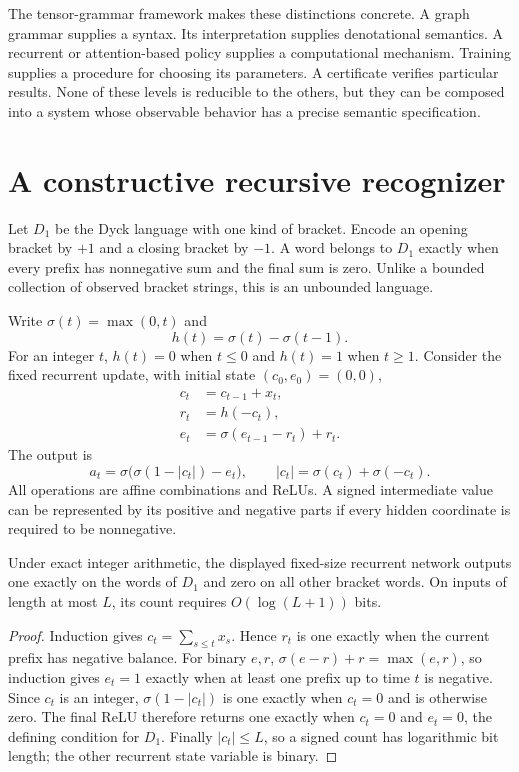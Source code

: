 The tensor-grammar framework makes these distinctions concrete. A graph grammar supplies a syntax. Its interpretation supplies denotational semantics. A recurrent or attention-based policy supplies a computational mechanism. Training supplies a procedure for choosing its parameters. A certificate verifies particular results. None of these levels is reducible to the others, but they can be composed into a system whose observable behavior has a precise semantic specification.

\section{A constructive recursive recognizer}

Let $D_1$ be the Dyck language with one kind of bracket. Encode an opening bracket by $+1$ and a closing bracket by $-1$. A word belongs to $D_1$ exactly when every prefix has nonnegative sum and the final sum is zero. Unlike a bounded collection of observed bracket strings, this is an unbounded language.

Write $\sigma(t)=\max(0,t)$ and
\[
 h(t)=\sigma(t)-\sigma(t-1).
\]
For an integer $t$, $h(t)=0$ when $t\le0$ and $h(t)=1$ when $t\ge1$. Consider the fixed recurrent update, with initial state $(c_0,e_0)=(0,0)$,
\begin{align*}
 c_t&=c_{t-1}+x_t,\\
 r_t&=h(-c_t),\\
 e_t&=\sigma(e_{t-1}-r_t)+r_t.
\end{align*}
The output is
\[
 a_t=\sigma\bigl(\sigma(1-|c_t|)-e_t\bigr),
 \qquad |c_t|=\sigma(c_t)+\sigma(-c_t).
\]
All operations are affine combinations and ReLUs. A signed intermediate value can be represented by its positive and negative parts if every hidden coordinate is required to be nonnegative.

\begin{theorem}
\label{thm:relu-dyck}
Under exact integer arithmetic, the displayed fixed-size recurrent network outputs one exactly on the words of $D_1$ and zero on all other bracket words. On inputs of length at most $L$, its count requires $O(\log(L+1))$ bits.
\end{theorem}
\begin{proof}
Induction gives $c_t=\sum_{s\le t}x_s$. Hence $r_t$ is one exactly when the current prefix has negative balance. For binary $e,r$, $\sigma(e-r)+r=\max(e,r)$, so induction gives $e_t=1$ exactly when at least one prefix up to time $t$ is negative. Since $c_t$ is an integer, $\sigma(1-|c_t|)$ is one exactly when $c_t=0$ and is otherwise zero. The final ReLU therefore returns one exactly when $c_t=0$ and $e_t=0$, the defining condition for $D_1$. Finally $|c_t|\le L$, so a signed count has logarithmic bit length; the other recurrent state variable is binary.
\end{proof}

